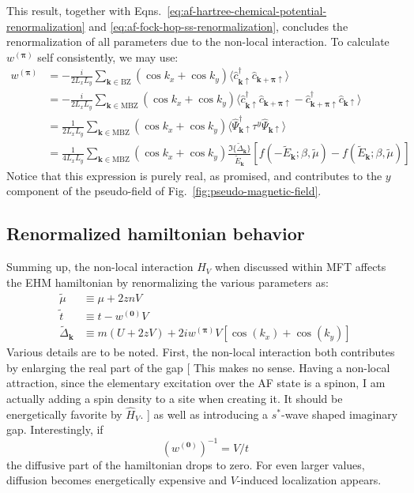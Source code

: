 This result, together with Eqns.~\eqref{eq:af-hartree-chemical-potential-renormalization} and \eqref{eq:af-fock-hop-ss-renormalization}, concludes the renormalization of all parameters due to the non-local interaction. To calculate $w^{(\bm{\pi})}$ self consistently, we may use:
\begin{align}
	w^{(\bm{\pi})} &= -\frac{i}{2L_xL_y} \sum_{\mathbf{k}\in\mathrm{BZ}}
	\left(
		\cos k_x + \cos k_y
	\right) \langle
		\hat c_{\mathbf{k}\uparrow}^\dagger  \hat c_{\mathbf{k}+\bm{\pi}\uparrow}
	\rangle \nonumber \\
	&= -\frac{i}{2L_xL_y} \sum_{\mathbf{k}\in\mathrm{MBZ}}
	\left(
		\cos k_x + \cos k_y
	\right) \langle
		\hat c_{\mathbf{k}\uparrow}^\dagger  \hat c_{\mathbf{k}+\bm{\pi}\uparrow} - \hat c_{\mathbf{k}+\bm{\pi}\uparrow}^\dagger  \hat c_{\mathbf{k}\uparrow}
	\rangle \nonumber  \\
	&= \frac{1}{2L_xL_y} \sum_{\mathbf{k}\in\mathrm{MBZ}}
	\left(
	\cos k_x + \cos k_y
	\right) \langle
		\hat \Psi_{\mathbf{k}\uparrow}^\dagger \tau^y \hat \Psi_{\mathbf{k}\uparrow}
	\rangle \nonumber \\
	&= \frac{1}{4L_xL_y} \sum_{\mathbf{k}\in\mathrm{MBZ}}
	\left(
		\cos k_x + \cos k_y
	\right) \frac{\Im\{\tilde{\Delta}_\mathbf{k}\}}{\tilde{E}_\mathbf{k}} \left[
		f\left(
			-\tilde{E}_\mathbf{k};\beta,\tilde{\mu}
		\right) - f\left(
			\tilde{E}_\mathbf{k};\beta,\tilde{\mu}
		\right)
	\right] \label{eq:af-renormalized-self-consistent-equation-wpi}
 	\end{align}
Notice that this expression is purely real, as promised, and contributes to the $y$ component of the pseudo-field of Fig.~\ref{fig:pseudo-magnetic-field}.

\subsection{Renormalized hamiltonian behavior}

Summing up, the non-local interaction $\hat H_V$ when discussed within MFT affects the EHM hamiltonian by renormalizing the various parameters as:
\[
\begin{aligned}
	\tilde{\mu} &\equiv \mu + 2znV \\
	\tilde{t} &\equiv t - w^{(\mathbf{0})} V \\
	\tilde{\Delta}_\mathbf{k} &\equiv
	m(U + 2zV) + 2iw^{(\bm{\pi})}V
	\left[
		\cos \left(
			k_x
		\right)	+ \cos \left(
			k_y
		\right)	
	\right]
\end{aligned}
\]
Various details are to be noted. First, the non-local interaction both contributes by enlarging the real part of the gap {\color{tabred}[
	This makes no sense. Having a non-local attraction, since the elementary excitation over the AF state is a spinon, I am actually adding a spin density to a site when creating it. It should be energetically favorite by $\hat H_V$.
]} as well as introducing a $s^*$-wave shaped imaginary gap. Interestingly, if
\[
	\left(w^{(\mathbf{0})}\right)^{-1} = V/t
\]
the diffusive part of the hamiltonian drops to zero. For even larger values, diffusion becomes energetically expensive and $V$-induced localization appears.

